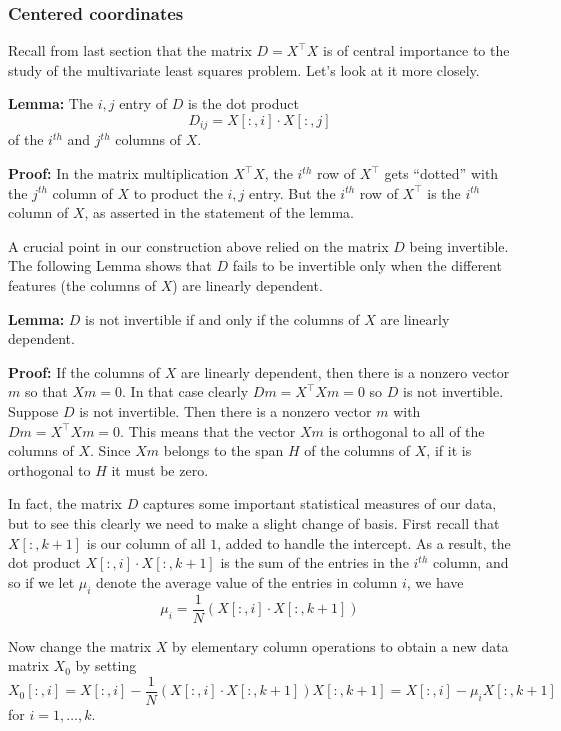 \documentclass[]{article}
\begin{document}
\hypertarget{centered-coordinates}{%
\subsubsection{Centered coordinates}\label{centered-coordinates}}

Recall from last section that the matrix \(D=X^{\intercal}X\) is of
central importance to the study of the multivariate least squares
problem. Let's look at it more closely.

\textbf{Lemma:} The \(i,j\) entry of \(D\) is the dot product \[
D_{ij}=X[:,i]\cdot X[:,j]
\] of the \(i^{th}\) and \(j^{th}\) columns of \(X\).

\textbf{Proof:} In the matrix multiplication \(X^{\intercal}X\), the
\(i^{th}\) row of \(X^{\intercal}\) gets ``dotted'' with the \(j^{th}\)
column of \(X\) to product the \(i,j\) entry. But the \(i^{th}\) row of
\(X^{\intercal}\) is the \(i^{th}\) column of \(X\), as asserted in the
statement of the lemma.

A crucial point in our construction above relied on the matrix \(D\)
being invertible. The following Lemma shows that \(D\) fails to be
invertible only when the different features (the columns of \(X\)) are
linearly dependent.

\textbf{Lemma:} \(D\) is not invertible if and only if the columns of
\(X\) are linearly dependent.

\textbf{Proof:} If the columns of \(X\) are linearly dependent, then
there is a nonzero vector \(m\) so that \(Xm=0\). In that case clearly
\(Dm=X^{\intercal}Xm=0\) so \(D\) is not invertible. Suppose \(D\) is
not invertible. Then there is a nonzero vector \(m\) with
\(Dm=X^{\intercal}Xm=0\). This means that the vector \(Xm\) is
orthogonal to all of the columns of \(X\). Since \(Xm\) belongs to the
span \(H\) of the columns of \(X\), if it is orthogonal to \(H\) it must
be zero.

In fact, the matrix \(D\) captures some important statistical measures
of our data, but to see this clearly we need to make a slight change of
basis. First recall that \(X[:,k+1]\) is our column of all \(1\), added
to handle the intercept. As a result, the dot product
\(X[:,i]\cdot X[:,k+1]\) is the sum of the entries in the \(i^{th}\)
column, and so if we let \(\mu_{i}\) denote the average value of the
entries in column \(i\), we have \[
\mu_{i} = \frac{1}{N}(X[:,i]\cdot X[:,k+1])
\]

Now change the matrix \(X\) by elementary column operations to obtain a
new data matrix \(X_{0}\) by setting \[
X_{0}[:,i] = X[:,i]-\frac{1}{N}(X[:,i]\cdot X[:,k+1])X[:,k+1] = X[:,i]-\mu_{i}X[:,k+1]
\] for \(i=1,\ldots, k\).
\end{document}
